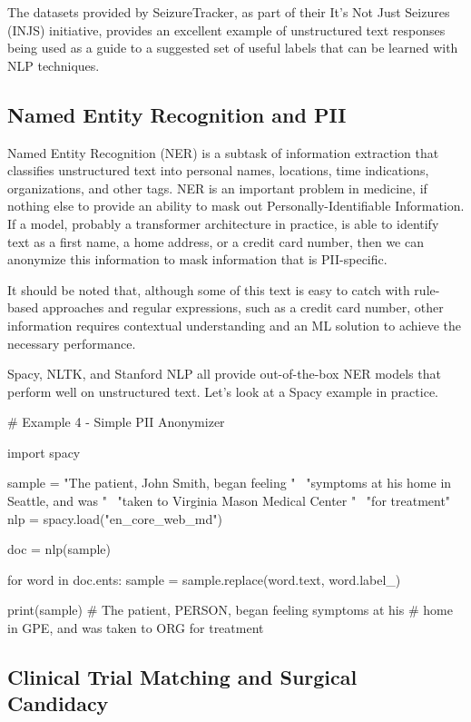 The datasets provided by SeizureTracker, as part of their It's Not Just Seizures (INJS) initiative, provides an excellent example of unstructured text responses being
used as a guide to a suggested set of useful labels that can be learned with NLP techniques.

\subsection{Named Entity Recognition and PII}

Named Entity Recognition (NER) is a subtask of information extraction that classifies unstructured text into personal names, locations, time indications, organizations, and other tags.
NER is an important problem in medicine, if nothing else to provide an ability to mask out Personally-Identifiable Information.
If a model, probably a transformer architecture in practice, is able to identify text as a first name, a home address, or a credit card number, then we can anonymize this information to mask information that is PII-specific.

It should be noted that, although some of this text is easy to catch with rule-based approaches and regular expressions, such as a credit card number, other information requires contextual understanding and an ML solution
to achieve the necessary performance.

Spacy, NLTK, and Stanford NLP all provide out-of-the-box NER models that perform well on unstructured text. Let's look at a Spacy example in practice.

\begin{python}
  # Example 4 - Simple PII Anonymizer

  import spacy

  sample = "The patient, John Smith, began feeling " \
           "symptoms at his home in Seattle, and was " \
           "taken to Virginia Mason Medical Center " \
           "for treatment"
  nlp = spacy.load("en_core_web_md")

  doc = nlp(sample)

  for word in doc.ents:
      sample = sample.replace(word.text, word.label_)

  print(sample)
  # The patient, PERSON, began feeling symptoms at his
  # home in GPE, and was taken to ORG for treatment

\end{python}

\subsection{Clinical Trial Matching and Surgical Candidacy}

